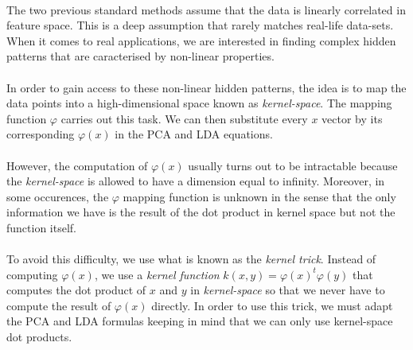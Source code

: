 \paragraph{}
The two previous standard methods assume that the data is linearly correlated in feature space. This
is a deep assumption that rarely matches real-life data-sets. When it comes to real applications, we
are interested in finding complex hidden patterns that are caracterised by non-linear properties.

\paragraph{}
In order to gain access to these non-linear hidden patterns, the idea is to map the data points into
a high-dimensional space known as \emph{kernel-space}. The mapping function $\varphi$ carries out
this task. We can then substitute every $x$ vector by its corresponding $\varphi(x)$ in the PCA and
LDA equations.

\paragraph{}
However, the computation of $\varphi(x)$ usually turns out to be intractable because the
\emph{kernel-space} is allowed to have a dimension equal to infinity. Moreover, in some occurences,
the $\varphi$ mapping function is unknown in the sense that the only information we have is the
result of the dot product in kernel space but not the function itself.

\paragraph{}
To avoid this difficulty, we use what is known as the \emph{kernel trick}. Instead of computing
$\varphi(x)$, we use a \emph{kernel function} $k(x, y) = \varphi(x)^t\varphi(y)$ that computes
the dot product of $x$ and $y$ in \emph{kernel-space} so that we never have to compute the result of
$\varphi(x)$ directly. In order to use this trick, we must adapt the PCA and LDA formulas keeping in
mind that we can only use kernel-space dot products.
